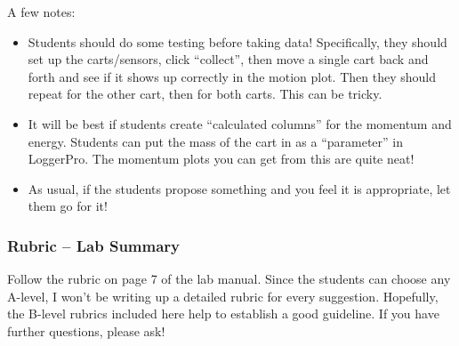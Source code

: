 \documentclass[fleqn,letterpaper]{article}
\begin{document}
A few notes:

\begin{itemize}
 \item{Students should do some testing before taking data!  Specifically, they should set up the carts/sensors, click ``collect'', then move a single cart back and forth and see if it shows up correctly in the motion plot.  Then they should repeat for the other cart, then for both carts.  This can be tricky.}
 \item{It will be best if students create ``calculated columns'' for the momentum and energy.  Students can put the mass of the cart in as a ``parameter'' in LoggerPro.  The momentum plots you can get from this are quite neat!}
 \item{As usual, if the students propose something and you feel it is appropriate, let them go for it!}
\end{itemize}

\subsubsection*{Rubric -- Lab Summary}

Follow the rubric on page 7 of the lab manual.  Since the students can choose any A-level, I won't be writing up a detailed rubric for every suggestion.  Hopefully, the B-level rubrics included here help to establish a good guideline.  If you have further questions, please ask!

\label{LastPage}
\end{document}
